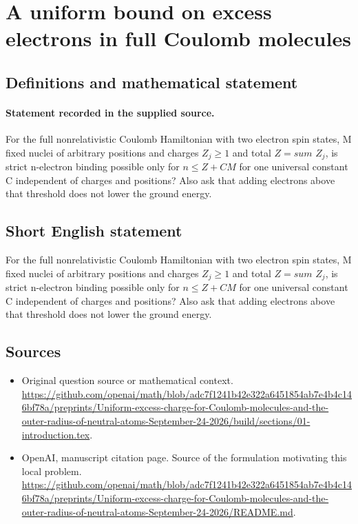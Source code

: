 \documentclass[11pt]{article}
\begin{document}
\section*{A uniform bound on excess electrons in full Coulomb molecules}\label{30007235}
\subsection{Definitions and mathematical statement}
\paragraph{Statement recorded in the supplied source.}
For the full nonrelativistic Coulomb Hamiltonian with two electron spin states, M fixed nuclei of arbitrary positions and charges $Z_j\geq 1$ and total $Z=sum$ $Z_j$, is strict n-electron binding possible only for $n\leq Z+CM$ for one universal constant C independent of charges and positions? Also ask that adding electrons above that threshold does not lower the ground energy.
\subsection{Short English statement}
For the full nonrelativistic Coulomb Hamiltonian with two electron spin states, M fixed nuclei of arbitrary positions and charges $Z_j\geq 1$ and total $Z=sum$ $Z_j$, is strict n-electron binding possible only for $n\leq Z+CM$ for one universal constant C independent of charges and positions? Also ask that adding electrons above that threshold does not lower the ground energy.
\subsection{Sources}
\begin{itemize}
\item[S1] Original question source or mathematical context.
\url{https://github.com/openai/math/blob/adc7f1241b42e322a6451854ab7e4b4c146bf78a/preprints/Uniform-excess-charge-for-Coulomb-molecules-and-the-outer-radius-of-neutral-atoms-September-24-2026/build/sections/01-introduction.tex}.
\item[S2] OpenAI, manuscript citation page. Source of the formulation motivating this local problem.
\url{https://github.com/openai/math/blob/adc7f1241b42e322a6451854ab7e4b4c146bf78a/preprints/Uniform-excess-charge-for-Coulomb-molecules-and-the-outer-radius-of-neutral-atoms-September-24-2026/README.md}.
\end{itemize}
\end{document}
